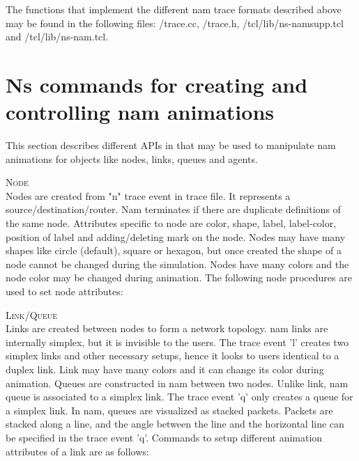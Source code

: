 The functions that implement the different nam trace formats described
above may be found in the following files: \ns/trace.cc, 
\ns/trace.h, \ns/tcl/lib/ns-namsupp.tcl and
\ns/tcl/lib/ns-nam.tcl.


\section{Ns commands for creating and controlling nam animations}
\label{sec:namcommands}

This section describes different APIs in \ns that may be used to
manipulate nam animations for objects like nodes, links, queues and
agents. 

\textsc{Node}\\
Nodes are created from "n" trace event in trace file. It represents a
source/destination/router. Nam terminates if there are duplicate
definitions of the same node. 
Attributes specific to node are color, shape, label, label-color, position
of label and adding/deleting mark on the node.
Nodes may have many shapes like circle (default), square or hexagon, but
once created the shape of a node cannot be changed during the simulation.
Nodes have many colors and the node color may be changed during animation. 
The following node procedures are used to set node attributes:


\textsc{Link/Queue}\\
Links are created between nodes to form a network topology. nam links are
internally simplex, but it is invisible to the users. The trace event 'l'
creates two simplex links and other necessary setups, hence it looks
to users identical to a duplex link. Link may have many colors and it can
change its color during animation. Queues are constructed in nam
between two nodes. Unlike link, nam queue is associated to a simplex link.
The trace event 'q' only creates a queue for a simplex link. In nam,
queues are visualized as stacked packets. Packets are stacked along a
line, and the angle between the line and the horizontal line can be
specified in the trace event 'q'.
Commands to setup different animation attributes of a link are as
follows:\\

